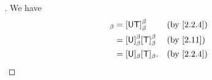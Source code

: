 \begin{proof}[]
  We have
  \begin{align*}
    [\U \T]_{\beta} & = [\U \T]_{\beta}^{\beta}                   &  & \text{(by \cref{2.2.4})} \\
                    & = [\U]_{\beta}^{\beta} [\T]_{\beta}^{\beta} &  & \text{(by \cref{2.11})}  \\
                    & = [\U]_{\beta} [\T]_{\beta}.                &  & \text{(by \cref{2.2.4})}
  \end{align*}
\end{proof}
